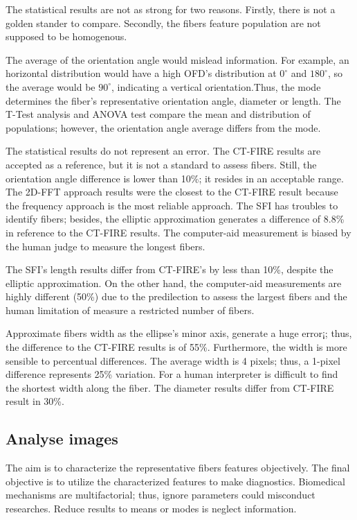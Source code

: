 \documentclass[12pt,a4paper]{article}
\begin{document}
The statistical results are not as strong for two reasons. Firstly, there is not a golden stander to compare. Secondly, the fibers feature population are not supposed to be homogenous. 

 The average of the orientation angle would mislead information. For example, an horizontal distribution would have a high OFD's distribution at $0^{\circ}$ and $180^{\circ}$, so the average would be $90^{\circ}$, indicating a vertical orientation.Thus,   the mode determines the fiber's representative orientation angle, diameter or length. The T-Test analysis and ANOVA test compare the mean and distribution of populations; however, the orientation angle average differs from the mode. 
 
The statistical results do not represent an error. The CT-FIRE results are accepted as a reference, but it is not a standard to assess fibers. Still, the orientation angle difference is lower than 10\%; it resides in an acceptable range. The 2D-FFT approach results were the closest to the CT-FIRE result because the frequency approach is the most reliable approach. The SFI has troubles to identify fibers; besides, the elliptic approximation generates a difference of 8.8\% in reference to the CT-FIRE results. The computer-aid measurement is biased by the human judge to measure the longest fibers. 
 
The SFI's length results differ from CT-FIRE's by less than 10\%, despite the elliptic approximation. On the other hand, the computer-aid measurements are highly different (50\%) due to the predilection to assess the largest fibers and the human limitation of measure a restricted number of fibers.
 
Approximate fibers width as the ellipse's minor axis, generate a huge error¡; thus, the difference to the CT-FIRE results is of 55\%. Furthermore, the width is more sensible to percentual differences. The average width is 4 pixels; thus, a 1-pixel difference represents 25\% variation. For a human interpreter is difficult to find the shortest width along the fiber.  The diameter results differ from CT-FIRE result in 30\%. 

\subsection{Analyse images}
The aim is to characterize the representative fibers features objectively. The final objective is to utilize the characterized features to make diagnostics.  Biomedical mechanisms are multifactorial; thus, ignore parameters could misconduct researches. Reduce results to means or modes is neglect information.
\end{document}
